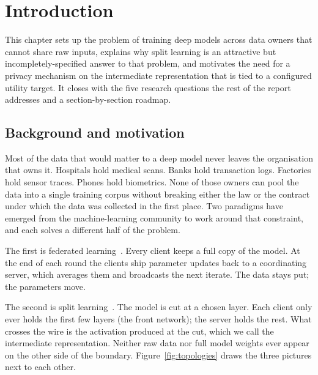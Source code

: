 \documentclass[11pt,a4paper,oneside]{report}
\begin{document}
\clearpage

\setcounter{page}{1}
\pagestyle{fancy}

\chapter{Introduction}
\label{ch:intro}

This chapter sets up the problem of training deep models across
data owners that cannot share raw inputs, explains why split learning
is an attractive but incompletely-specified answer to that problem,
and motivates the need for a privacy mechanism on the intermediate
representation that is tied to a configured utility target. It
closes with the five research questions the rest of the report
addresses and a section-by-section roadmap.

\section{Background and motivation}

Most of the data that would matter to a deep model never leaves the
organisation that owns it. Hospitals hold medical scans. Banks hold
transaction logs. Factories hold sensor traces. Phones hold biometrics.
None of those owners can pool the data into a single training corpus
without breaking either the law or the contract under which the data
was collected in the first place. Two paradigms have emerged from the
machine-learning community to work around that constraint, and each
solves a different half of the problem.

The first is federated learning~\cite{mcmahan2017fedavg}. Every client
keeps a full copy of the model. At the end of each round the clients
ship parameter updates back to a coordinating server, which averages
them and broadcasts the next iterate. The data stays put; the
parameters move.

The second is split learning~\cite{vepakomma2018splitnn,gupta2018splitnn}.
The model is cut at a chosen layer. Each client only ever holds the
first few layers (the front network); the server holds the rest. What
crosses the wire is the activation produced at the cut, which we call
the intermediate representation. Neither raw data nor full model
weights ever appear on the other side of the boundary.
Figure~\ref{fig:topologies} draws the three pictures next to each other.
\end{document}
